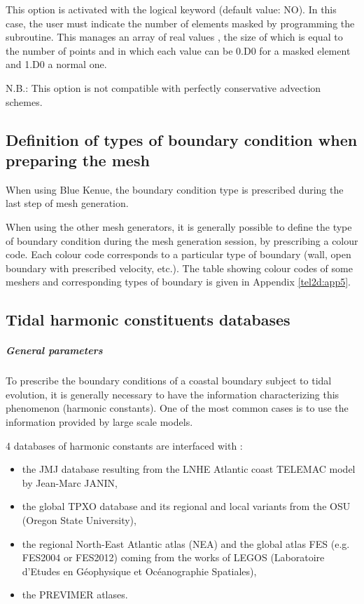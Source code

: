 This option is activated with the logical keyword
 (default value: NO).
In this case, the user must indicate the number of elements masked
by programming the  subroutine.
This manages an array of real values , the size of which
is equal to the number of points and in which each value can be 0.D0
for a masked element and 1.D0 a normal one.

N.B.: This option is not compatible with perfectly conservative advection schemes.


\subsection{Definition of types of boundary condition when preparing the mesh}

When using Blue Kenue, the boundary condition type is prescribed during the last
step of mesh generation.

When using the other mesh generators, it is generally possible to define
the type of boundary condition during the mesh generation session, by prescribing
a colour code.
Each colour code corresponds to a particular type of boundary
(wall, open boundary with prescribed velocity, etc.).
The table showing colour codes of some meshers and corresponding types of
boundary is given in Appendix \ref{tel2d:app5}.


\subsection{Tidal harmonic constituents databases}
\label{subs:tidal:harm:datab}

\subparagraph{General parameters}

To prescribe the boundary conditions of a coastal boundary subject to tidal
evolution, it is generally necessary to have the information characterizing
this phenomenon (harmonic constants).
One of the most common cases is to use the information provided by large scale
models.

4 databases of harmonic constants are interfaced with :

\begin{itemize}
\item the JMJ database resulting from the LNHE Atlantic coast TELEMAC model by
Jean-Marc JANIN,

\item the global TPXO database and its regional and local variants from the OSU
(Oregon State University),

\item the regional North-East Atlantic atlas (NEA) and the global atlas FES
(e.g. FES2004 or FES2012) coming from the works of LEGOS
(Laboratoire d'Etudes en G\'{e}ophysique et Oc\'{e}anographie Spatiales),

\item the PREVIMER atlases.
\end{itemize}

